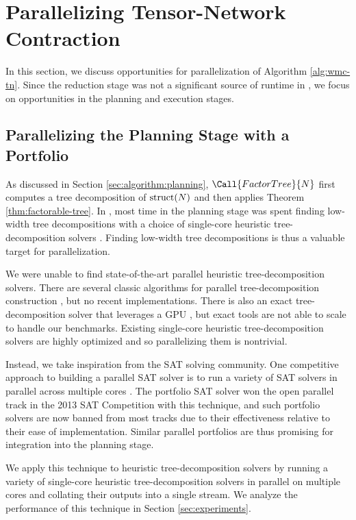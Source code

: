 \section{Parallelizing Tensor-Network Contraction}
\label{sec:parallel}

In this section, we discuss opportunities for parallelization of Algorithm \ref{alg:wmc-tn}. Since the reduction stage was not a significant source of runtime in \cite{DDV19}, we focus on opportunities in the planning and execution stages.

\subsection{Parallelizing the Planning Stage with a Portfolio}
\label{sec:parallel:planning}
As discussed in Section \ref{sec:algorithm:planning}, $\Call{FactorTree}{N}$ first computes a tree decomposition of $\text{struct}(N)$ and then applies Theorem \ref{thm:factorable-tree}. In \cite{DDV19}, most time in the planning stage was spent finding low-width tree decompositions with a choice of single-core heuristic tree-decomposition solvers \cite{AMW17,HS18,Tamaki17}. Finding low-width tree decompositions is thus a valuable target for parallelization.

We were unable to find state-of-the-art parallel heuristic tree-decomposition solvers. There are several classic algorithms for parallel tree-decomposition construction \cite{Lagergren90,SWG13}, but no recent implementations. There is also an exact tree-decomposition solver that leverages a GPU \cite{VB17}, but exact tools are not able to scale to handle our benchmarks. Existing single-core heuristic tree-decomposition solvers are highly optimized and so parallelizing them is nontrivial.

Instead, we take inspiration from the SAT solving community. One competitive approach to building a parallel SAT solver is to run a variety of SAT solvers in parallel across multiple cores \cite{BSS15,MSSS13,XHHL08}. The portfolio SAT solver  \cite{MSSS13} won the open parallel track in the 2013 SAT Competition with this technique, and such portfolio solvers are now banned from most tracks due to their effectiveness relative to their ease of implementation. Similar parallel portfolios are thus promising for integration into the planning stage.

We apply this technique to heuristic tree-decomposition solvers by running a variety of single-core heuristic tree-decomposition solvers in parallel on multiple cores and collating their outputs into a single stream. We analyze the performance of this technique in Section \ref{sec:experiments}.

